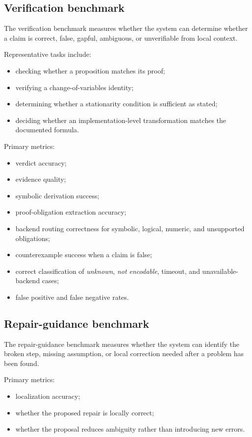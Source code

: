 \subsection{Verification benchmark}
The verification benchmark measures whether the system can determine whether a claim is correct, false, gapful, ambiguous, or unverifiable from local context.

Representative tasks include:
\begin{itemize}
  \item checking whether a proposition matches its proof;
  \item verifying a change-of-variables identity;
  \item determining whether a stationarity condition is sufficient as stated;
  \item deciding whether an implementation-level transformation matches the documented formula.
\end{itemize}

Primary metrics:
\begin{itemize}
  \item verdict accuracy;
  \item evidence quality;
  \item symbolic derivation success;
  \item proof-obligation extraction accuracy;
  \item backend routing correctness for symbolic, logical, numeric, and unsupported obligations;
  \item counterexample success when a claim is false;
  \item correct classification of \emph{unknown}, \emph{not encodable}, timeout, and unavailable-backend cases;
  \item false positive and false negative rates.
\end{itemize}

\subsection{Repair-guidance benchmark}
The repair-guidance benchmark measures whether the system can identify the broken step, missing assumption, or local correction needed after a problem has been found.

Primary metrics:
\begin{itemize}
  \item localization accuracy;
  \item whether the proposed repair is locally correct;
  \item whether the proposal reduces ambiguity rather than introducing new errors.
\end{itemize}


